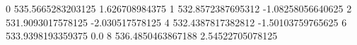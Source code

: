 0 535.5665283203125 1.626708984375
1 532.8572387695312 -1.08258056640625
2 531.9093017578125 -2.030517578125
4 532.4387817382812 -1.50103759765625
6 533.9398193359375 0.0
8 536.4850463867188 2.54522705078125
